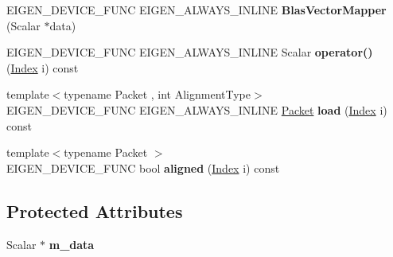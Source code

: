 \begin{DoxyCompactItemize}
\item 
\mbox{\label{class_eigen_1_1internal_1_1_blas_vector_mapper_af960b8e257c177df77229dfdb693ce11}} 
E\+I\+G\+E\+N\+\_\+\+D\+E\+V\+I\+C\+E\+\_\+\+F\+U\+NC E\+I\+G\+E\+N\+\_\+\+A\+L\+W\+A\+Y\+S\+\_\+\+I\+N\+L\+I\+NE {\bfseries Blas\+Vector\+Mapper} (Scalar $\ast$data)
\item 
\mbox{\label{class_eigen_1_1internal_1_1_blas_vector_mapper_aad255f311f5104bb1ab25555b5064053}} 
E\+I\+G\+E\+N\+\_\+\+D\+E\+V\+I\+C\+E\+\_\+\+F\+U\+NC E\+I\+G\+E\+N\+\_\+\+A\+L\+W\+A\+Y\+S\+\_\+\+I\+N\+L\+I\+NE Scalar {\bfseries operator()} (\hyperlink{namespace_eigen_a62e77e0933482dafde8fe197d9a2cfde}{Index} i) const
\item 
\mbox{\label{class_eigen_1_1internal_1_1_blas_vector_mapper_a2a6098ea0c20a5f32b672b713819175c}} 
{\footnotesize template$<$typename Packet , int Alignment\+Type$>$ }\\E\+I\+G\+E\+N\+\_\+\+D\+E\+V\+I\+C\+E\+\_\+\+F\+U\+NC E\+I\+G\+E\+N\+\_\+\+A\+L\+W\+A\+Y\+S\+\_\+\+I\+N\+L\+I\+NE \hyperlink{union_eigen_1_1internal_1_1_packet}{Packet} {\bfseries load} (\hyperlink{namespace_eigen_a62e77e0933482dafde8fe197d9a2cfde}{Index} i) const
\item 
\mbox{\label{class_eigen_1_1internal_1_1_blas_vector_mapper_ab5c476e3545d42b5be634611a2a7523a}} 
{\footnotesize template$<$typename Packet $>$ }\\E\+I\+G\+E\+N\+\_\+\+D\+E\+V\+I\+C\+E\+\_\+\+F\+U\+NC bool {\bfseries aligned} (\hyperlink{namespace_eigen_a62e77e0933482dafde8fe197d9a2cfde}{Index} i) const
\end{DoxyCompactItemize}
\subsection*{Protected Attributes}
\begin{DoxyCompactItemize}
\item 
\mbox{\label{class_eigen_1_1internal_1_1_blas_vector_mapper_ab23d304ec6b7b2abf93718f1bb7a735d}} 
Scalar $\ast$ {\bfseries m\+\_\+data}
\end{DoxyCompactItemize}



